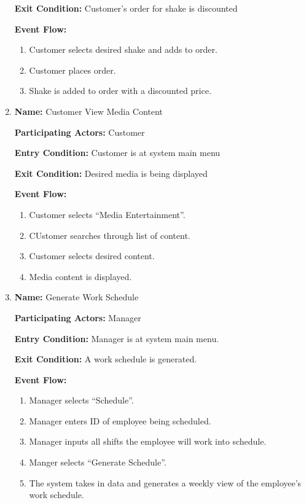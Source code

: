 \documentclass[11pt]{article}
\begin{document}
\begin{enumerate}
			\textbf{Exit Condition:} 		Customer's order for shake is discounted

			\textbf{Event Flow:}
			\begin{enumerate}
				\setlength{\leftskip}{1cm}
				\item Customer selects desired shake and adds to order.
				\item Customer places order.
				\item Shake is added to order with a discounted price.\\
			\end{enumerate}

		\newpage

		\item \textbf{Name:} 				Customer View Media Content

			\textbf{Participating Actors:} 	Customer

			\textbf{Entry Condition:} 		Customer is at system main menu

			\textbf{Exit Condition:} 		Desired media is being displayed

			\textbf{Event Flow:}
			\begin{enumerate}
				\setlength{\leftskip}{1cm}
				\item Customer selects ``Media Entertainment''.
				\item CUstomer searches through list of content.
				\item Customer selects desired content.
				\item Media content is displayed.\\
			\end{enumerate}

		\item \textbf{Name:} 				Generate Work Schedule

			\textbf{Participating Actors:} 	Manager

			\textbf{Entry Condition:} 		Manager is at system main menu.

			\textbf{Exit Condition:} 		A work schedule is generated.

			\textbf{Event Flow:}
			\begin{enumerate}
				\setlength{\leftskip}{1cm}
				\item Manager selects ``Schedule''.
				\item Manager enters ID of employee being scheduled.
				\item Manager inputs all shifts the employee will work into schedule.
				\item Manger selects ``Generate Schedule''.
				\item The system takes in data and generates a weekly view of the employee's work schedule.\\
			\end{enumerate}


\end{enumerate}
\end{document}
